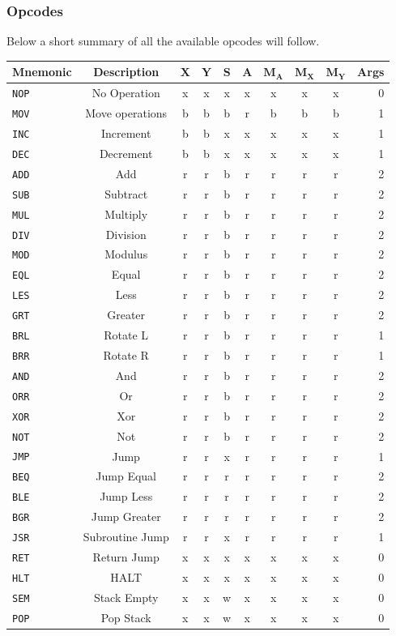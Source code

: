 \documentclass{article}
\newcommand{\V}{\verb}
\newcommand{\x}{$\textbf{X}$}
\newcommand{\y}{$\textbf{Y}$}
\newcommand{\s}{$\textbf{S}$}
\newcommand{\A}{$\textbf{A}$}
\newcommand{\mx}{$\textbf{M}_{\textbf{X}}$}
\newcommand{\my}{$\textbf{M}_{\textbf{Y}}$}
\newcommand{\ma}{$\textbf{M}_{\textbf{A}}$}
\begin{document}
\subsubsection{Opcodes}
Below a short summary of all the available opcodes will follow.\\
\begin{tabular}{l || c | *{7}{c|} | r}
\textbf{Mnemonic} & \textbf{Description} & \x & \y& \s & \A &\ma & \mx & \my &
Args
\\
\hline
\V+NOP+ & No Operation & x & x & x & x & x & x & x & 0  \\
\hline
\V+MOV+ & Move operations & b & b & b & r & b & b & b & 1 \\
\hline
\V+INC+ & Increment& b & b & x & x & x & x & x & 1 \\
\V+DEC+ & Decrement	& b & b & x & x & x & x & x & 1 \\
\V+ADD+ & Add		& r & r & b & r & r & r & r & 2 \\
\V+SUB+ & Subtract	& r & r & b & r & r & r & r & 2 \\
\V+MUL+ & Multiply	& r & r & b & r & r & r & r & 2 \\
\V+DIV+ & Division	& r & r & b & r & r & r & r & 2 \\
\V+MOD+ & Modulus	& r & r & b & r & r & r & r & 2 \\
\hline
\V+EQL+ & Equal		& r & r & b & r & r & r & r & 2 \\
\V+LES+ & Less		& r & r & b & r & r & r & r & 2 \\
\V+GRT+ & Greater 	& r & r & b & r & r & r & r & 2 \\
\V+BRL+ & Rotate L	& r & r & b & r & r & r & r & 1 \\
\V+BRR+ & Rotate R	& r & r & b & r & r & r & r & 1 \\
\V+AND+ & And		& r & r & b & r & r & r & r & 2 \\
\V+ORR+ & Or 		& r & r & b & r & r & r & r & 2 \\
\V+XOR+ & Xor		& r & r & b & r & r & r & r & 2 \\
\V+NOT+ & Not		& r & r & b & r & r & r & r & 2 \\
\hline
\V+JMP+ & Jump		& r & r & x & r & r & r & r & 1 \\
\V+BEQ+ & Jump Equal& r & r & r & r & r & r & r & 2 \\
\V+BLE+ & Jump Less	& r & r & r & r & r & r & r & 2 \\
\V+BGR+ & Jump Greater& r & r & r & r & r & r & r & 2 \\
\V+JSR+ & Subroutine Jump& r & r & x & r & r & r & r & 1 \\
\V+RET+ & Return Jump& x & x & x & x & x & x & x & 0 \\
\hline
\V+HLT+ & HALT& x & x & x & x & x & x & x & 0 \\
\V+SEM+ & Stack Empty& x & x & w & x & x & x & x & 0 \\
\V+POP+ & Pop Stack& x & x & w & x & x & x & x & 0 \\
\end{tabular}
\end{document}
